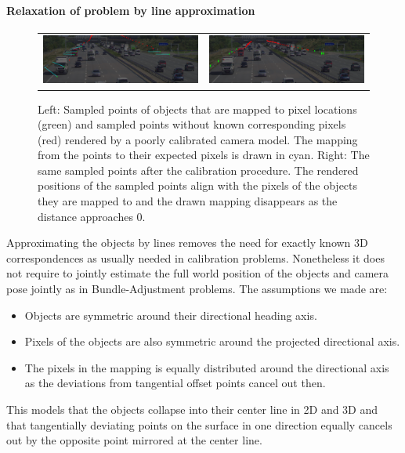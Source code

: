 \paragraph{Relaxation of problem by line approximation}
\begin{figure}[!ht]
  \begin{tabular}{cc}
    \includegraphics[width=0.5\linewidth]{images/calibration/background_uncalibrated_with_mapping.png}    &  
    \includegraphics[width=0.5\linewidth]{images/calibration/background_calibrated.png}    
  \end{tabular}
  \caption{Left: Sampled points of objects that are mapped to pixel locations (green) and sampled points without known corresponding pixels (red) rendered by a poorly calibrated camera model.
  The mapping from the points to their expected pixels is drawn in cyan.
  Right: The same sampled points after the calibration procedure.
  The rendered positions of the sampled points align with the pixels of the objects they are mapped to and the drawn mapping disappears as the distance approaches $0$.  }
  \label{fig:calibration}
  \end{figure}
Approximating the objects by lines removes the need for exactly known 3D correspondences as usually needed in calibration problems. 
Nonetheless it does not require to jointly estimate the full world position of the objects and camera pose jointly as in Bundle-Adjustment problems.
%
The assumptions we made are: 
\begin{itemize}
  \item Objects are symmetric around their directional heading axis.
  \item Pixels of the objects are also symmetric around the projected directional axis.
  \item The pixels in the mapping is equally distributed around the directional axis as the deviations from tangential offset points cancel out then. 
\end{itemize}

This models that the objects collapse into their center line in 2D and 3D and that tangentially deviating points on the surface in one direction equally cancels out by the opposite point mirrored at the center line.

